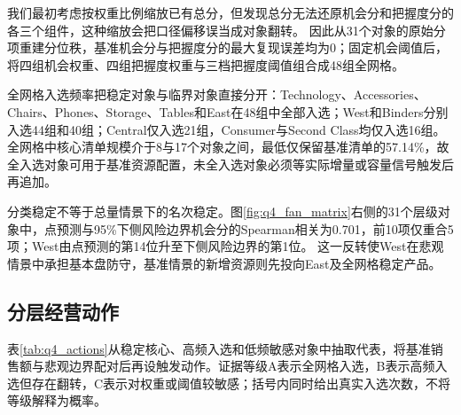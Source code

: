 我们最初考虑按权重比例缩放已有总分，但发现总分无法还原机会分和把握度分的各三个组件，这种缩放会把口径偏移误当成对象翻转。%
因此从31个对象的原始分项重建分位秩，基准机会分与把握度分的最大复现误差均为0；固定机会阈值后，将四组机会权重、四组把握度权重与三档把握度阈值组合成48组全网格。%

全网格入选频率把稳定对象与临界对象直接分开：Technology、Accessories、Chairs、Phones、Storage、Tables和East在48组中全部入选；West和Binders分别入选44组和40组；Central仅入选21组，Consumer与Second Class均仅入选16组。%
全网格中核心清单规模介于8与17个对象之间，最低仅保留基准清单的57.14\%，故全入选对象可用于基准资源配置，未全入选对象必须等实际增量或容量信号触发后再追加。%

分类稳定不等于总量情景下的名次稳定。图\ref{fig:q4_fan_matrix}右侧的31个层级对象中，点预测与95\%下侧风险边界机会分的Spearman相关为0.701，前10项仅重合5项；West由点预测的第14位升至下侧风险边界的第1位。%
这一反转使West在悲观情景中承担基本盘防守，基准情景的新增资源则先投向East及全网格稳定产品。

\subsection{分层经营动作}

表\ref{tab:q4_actions}从稳定核心、高频入选和低频敏感对象中抽取代表，将基准销售额与悲观边界配对后再设触发动作。证据等级A表示全网格入选，B表示高频入选但存在翻转，C表示对权重或阈值较敏感；括号内同时给出真实入选次数，不将等级解释为概率。%

